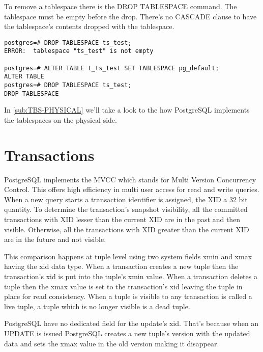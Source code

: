 To remove a tablespace there is the  DROP TABLESPACE command. The tablespace 
must be empty before the drop. There's no CASCADE clause to have the 
tablespace's contents dropped with the tablespace.

\begin{lstlisting}[style=pgsql]
postgres=# DROP TABLESPACE ts_test;
ERROR:  tablespace "ts_test" is not empty

postgres=# ALTER TABLE t_ts_test SET TABLESPACE pg_default;
ALTER TABLE
postgres=# DROP TABLESPACE ts_test;
DROP TABLESPACE

\end{lstlisting}

In \ref{sub:TBS-PHYSICAL} we'll take a look to the how PostgreSQL 
implements the tablespaces on the physical side.

\section{Transactions}
\label{sec:TRANSACTION}
PostgreSQL implements the MVCC which stands for Multi Version 
Concurrency Control. 
This offers high efficiency in multi user access for read and write queries.
When a new query starts a transaction identifier is assigned, the XID 
 a 32 bit quantity. To determine the transaction's snapshot 
visibility, all the committed transactions with XID lesser than the current XID 
are in the past and then visible. Otherwise, all the transactions with XID 
greater than the current XID are in the future and not visible.\newline

This comparison happens at tuple level using two system fields xmin and xmax 
having the xid data type. 
When a transaction creates a new tuple then the transaction's xid is put into 
the tuple's xmin value. 
When a transaction deletes a tuple then the xmax value is set to the 
transaction's xid leaving the tuple in place for read consistency. 
When a tuple is visible to any transaction is called a live tuple, a tuple 
which is no longer visible is a dead tuple.\newline

PostgreSQL have no dedicated field for the update's xid. That's because when an 
UPDATE is issued PostgreSQL creates a new tuple's version with the updated 
data and sets the xmax value in the old version making it disappear.\newline

